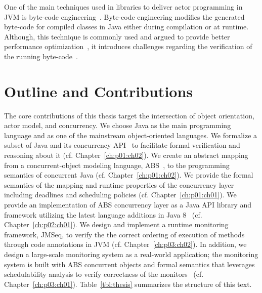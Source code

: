 One of the main techniques used in libraries to deliver actor programming in 
JVM is byte-code engineering~\cite{dahm1999byte,bruneton2002asm,asm}.
Byte-code engineering modifies the generated byte-code for compiled classes in 
Java either during compilation or at runtime.
Although, this technique is commonly used and argued to provide better 
performance optimization~\cite{vallee1999soot}, it introduces challenges 
regarding the verification of the running 
byte-code~\cite{leroy2001java,leroy2003java}.

\section{Outline and Contributions}
\label{sec:intro:contribs}

The core contributions of this thesis target the intersection of object 
orientation, actor model, and concurrency.
We choose Java as the main programming language and as one of the mainstream 
object-oriented languages. 
We formalize a subset of Java and its concurrency API~\cite{jsr166} to 
facilitate formal verification and reasoning about it (cf. Chapter~\ref{ch:p01:ch02}).
We create an abstract mapping from a concurrent-object modeling language, 
ABS~\cite{johnsen2012abs}, to the programming semantics of concurrent Java (cf. Chapter~\ref{ch:p01:ch02}). 
We provide the formal semantics of the mapping and runtime properties of 
the concurrency layer including deadlines and scheduling policies (cf. Chapter~\ref{ch:p01:ch01}).
We provide an implementation of ABS concurrency layer as a Java API library 
and framework utilizing the latest language additions 
in Java 8~\cite{jsr335:lambda:translation} (cf. Chapter~\ref{ch:p02:ch01}).
We design and implement a runtime monitoring framework, JMSeq, to verify the
the correct ordering of execution of methods through code annotations in JVM (cf. Chapter~\ref{ch:p03:ch02}). 
In addition, we design a large-scale monitoring system as a real-world 
application; the monitoring system is built with ABS concurrent objects 
and formal semantics that leverages schedulability 
analysis to verify correctness of the monitors~\cite{fersman2007task} (cf. Chapter~\ref{ch:p03:ch01}).
Table~\ref{tbl:thesis} summarizes the structure of this text.

